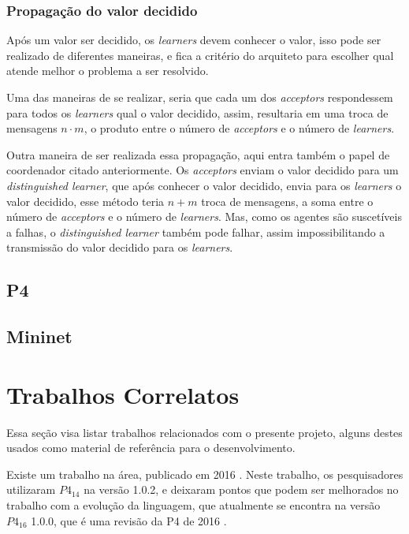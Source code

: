 \documentclass[12pt,
openright, 
oneside,
a4paper,
brazil]{facom-ufu-abntex2}
\theoremstyle{definition}
\begin{document}
\subsubsection{Propagação do valor decidido}
Após um valor ser decidido, os \textit{learners} devem conhecer o valor, isso pode ser realizado
de diferentes maneiras, e fica a critério do arquiteto para escolher qual atende melhor o
problema a ser resolvido.

Uma das maneiras de se realizar, seria que cada um dos \textit{acceptors} respondessem para
todos os \textit{learners} qual o valor decidido, assim, resultaria em uma troca de mensagens
$n \cdot m$, o produto entre o número de \textit{acceptors} e o número de \textit{learners}.

Outra maneira de ser realizada essa propagação, aqui entra também o papel de coordenador
citado anteriormente. Os \textit{acceptors} enviam o valor decidido para um
\textit{distinguished learner}, que após conhecer o valor decidido, envia para os
\textit{learners} o valor decidido, esse método teria $n + m$ troca de mensagens,
a soma entre o número de \textit{acceptors} e o número de \textit{learners}. Mas, como os
agentes são suscetíveis a falhas, o \textit{distinguished learner} também pode falhar,
assim impossibilitando a transmissão do valor decidido para os \textit{learners}.

\subsection{P4}
\subsection{Mininet}


\section{Trabalhos Correlatos}
Essa seção visa listar trabalhos relacionados com o presente projeto, alguns destes usados
como material de referência para o desenvolvimento.

Existe um trabalho na área, publicado em 2016 \citep{dang2016paxos}. Neste trabalho,
os pesquisadores utilizaram $P4_{14}$ na versão 1.0.2, e deixaram pontos que podem ser
melhorados no trabalho com a evolução da linguagem, que atualmente se encontra na versão
$P4_{16}$ 1.0.0, que é uma revisão da P4 de 2016 \citep{paxos16spec}.


\end{document}
